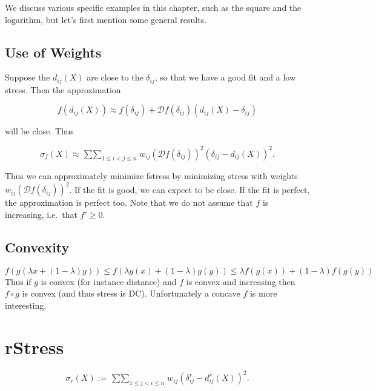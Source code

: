 \documentclass[
  12pt,
]{book}
\theoremstyle{definition}
\theoremstyle{definition}
\theoremstyle{definition}
\theoremstyle{definition}
\theoremstyle{remark}
\begin{document}
We discuss various specific examples in this chapter, such as the square and the logarithm, but let's first mention some general results.

\hypertarget{use-of-weights}{%
\subsection{Use of Weights}\label{use-of-weights}}

Suppose the \(d_{ij}(X)\) are close to the \(\delta_{ij}\), so that we have a good fit and a low stress. Then the approximation

\begin{equation}
f(d_{ij}(X))\approx f(\delta_{ij})+\mathcal{D}f(\delta_{ij})(d_{ij}(X)-\delta_{ij})
\label{eq:wfapprox}
\end{equation}

will be close. Thus

\begin{equation}
\sigma_f(X)\approx\mathop{\sum\sum}_{1\leq i<j\leq n}w_{ij}(\mathcal{D}f(\delta_{ij}))^2(\delta_{ij}-d_{ij}(X))^2.
\label{eq:wfstress}
\end{equation}

Thus we can approximately minimize fstress by minimizing stress with weights
\(w_{ij}(\mathcal{D}f(\delta_{ij}))^2\). If the fit is good, we can expect to be close.
If the fit is perfect, the approximation is perfect too. Note that we do not assume
that \(f\) is increasing, i.e.~that \(f'\geq 0\).

\hypertarget{convexity}{%
\subsection{Convexity}\label{convexity}}

\[
f(g(\lambda x + (1-\lambda)y))\leq f(\lambda g(x)+(1-\lambda)g(y))\leq\lambda f(g(x))+(1-\lambda)f(g(y))
\]
Thus if \(g\) is convex (for instance distance) and \(f\) is convex and increasing
then \(f\circ g\) is convex (and thus stress is DC). Unfortunately a concave \(f\) is more interesting.

\hypertarget{rstress}{%
\section{rStress}\label{rstress}}

\begin{equation}
\sigma_r(X):=\mathop{\sum\sum}_{1\leq j<i\leq n}w_{ij}(\delta_{ij}^r-d_{ij}^r(X))^2.
\label{eq:rstress}
\end{equation}
\end{document}
